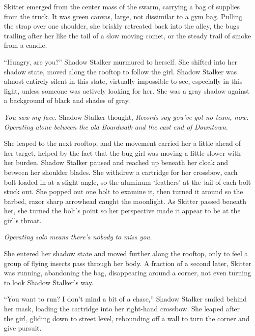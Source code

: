 Skitter emerged from the center mass of the swarm, carrying a bag of supplies from the truck.  It was green canvas, large, not dissimilar to a gym bag.  Pulling the strap over one shoulder, she briskly retreated back into the alley, the bugs trailing after her like the tail of a slow moving comet, or the steady trail of smoke from a candle.



``Hungry, are you?'' Shadow Stalker murmured to herself.  She shifted into her shadow state, moved along the rooftop to follow the girl.  Shadow Stalker was almost entirely silent in this state, virtually impossible to see, especially in this light, unless someone was actively looking for her.  She was a gray shadow against a background of black and shades of gray.



\emph{You saw my face.}  Shadow Stalker thought, \emph{Records say you've got no team, now.  Operating alone between the old Boardwalk and the east end of Downtown.}



She leaped to the next rooftop, and the movement carried her a little ahead of her target, helped by the fact that the bug girl was moving a little slower with her burden.  Shadow Stalker paused and reached up beneath her cloak and between her shoulder blades.  She withdrew a cartridge for her crossbow, each bolt loaded in at a slight angle, so the aluminum `feathers' at the tail of each bolt stuck out.  She popped out one bolt to examine it, then turned it around so the barbed, razor sharp arrowhead caught the moonlight.  As Skitter passed beneath her, she turned the bolt's point so her perspective made it appear to be at the girl's throat.



\emph{Operating solo means there's nobody to miss you}.



She entered her shadow state and moved further along the rooftop, only to feel a group of flying insects pass through her body.  A fraction of a second later, Skitter was running, abandoning the bag, disappearing around a corner, not even turning to look Shadow Stalker's way.



``You want to run?  I don't mind a bit of a chase,'' Shadow Stalker smiled behind her mask, loading the cartridge into her right-hand crossbow.  She leaped after the girl, gliding down to street level, rebounding off a wall to turn the corner and give pursuit.



